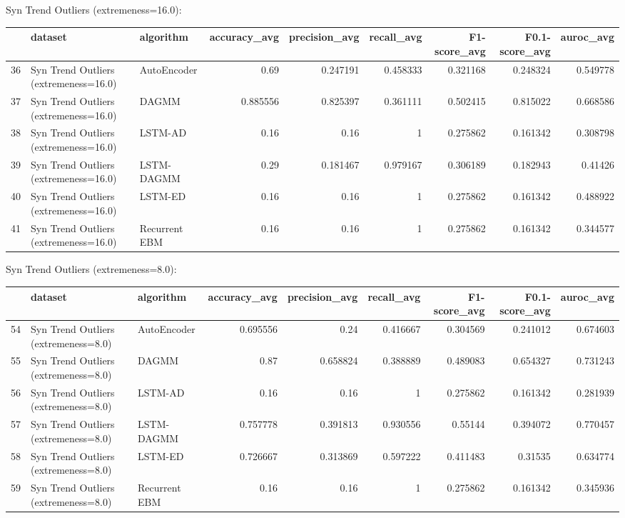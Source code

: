 Syn Trend Outliers (extremeness=16.0):

\begin{tabular}{rllrrrrrr}
\hline
    & dataset                               & algorithm     &   accuracy\_avg &   precision\_avg &   recall\_avg &   F1-score\_avg &   F0.1-score\_avg &   auroc\_avg \\
\hline
 36 & Syn Trend Outliers (extremeness=16.0) & AutoEncoder   &       0.69     &        0.247191 &     0.458333 &       0.321168 &         0.248324 &    0.549778 \\
 37 & Syn Trend Outliers (extremeness=16.0) & DAGMM         &       0.885556 &        0.825397 &     0.361111 &       0.502415 &         0.815022 &    0.668586 \\
 38 & Syn Trend Outliers (extremeness=16.0) & LSTM-AD       &       0.16     &        0.16     &     1        &       0.275862 &         0.161342 &    0.308798 \\
 39 & Syn Trend Outliers (extremeness=16.0) & LSTM-DAGMM    &       0.29     &        0.181467 &     0.979167 &       0.306189 &         0.182943 &    0.41426  \\
 40 & Syn Trend Outliers (extremeness=16.0) & LSTM-ED       &       0.16     &        0.16     &     1        &       0.275862 &         0.161342 &    0.488922 \\
 41 & Syn Trend Outliers (extremeness=16.0) & Recurrent EBM &       0.16     &        0.16     &     1        &       0.275862 &         0.161342 &    0.344577 \\
\hline
\end{tabular}

Syn Trend Outliers (extremeness=8.0):

\begin{tabular}{rllrrrrrr}
\hline
    & dataset                              & algorithm     &   accuracy\_avg &   precision\_avg &   recall\_avg &   F1-score\_avg &   F0.1-score\_avg &   auroc\_avg \\
\hline
 54 & Syn Trend Outliers (extremeness=8.0) & AutoEncoder   &       0.695556 &        0.24     &     0.416667 &       0.304569 &         0.241012 &    0.674603 \\
 55 & Syn Trend Outliers (extremeness=8.0) & DAGMM         &       0.87     &        0.658824 &     0.388889 &       0.489083 &         0.654327 &    0.731243 \\
 56 & Syn Trend Outliers (extremeness=8.0) & LSTM-AD       &       0.16     &        0.16     &     1        &       0.275862 &         0.161342 &    0.281939 \\
 57 & Syn Trend Outliers (extremeness=8.0) & LSTM-DAGMM    &       0.757778 &        0.391813 &     0.930556 &       0.55144  &         0.394072 &    0.770457 \\
 58 & Syn Trend Outliers (extremeness=8.0) & LSTM-ED       &       0.726667 &        0.313869 &     0.597222 &       0.411483 &         0.31535  &    0.634774 \\
 59 & Syn Trend Outliers (extremeness=8.0) & Recurrent EBM &       0.16     &        0.16     &     1        &       0.275862 &         0.161342 &    0.345936 \\
\hline
\end{tabular}

